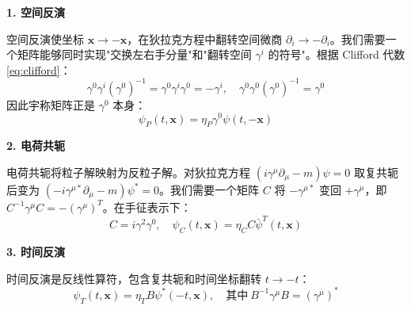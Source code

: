 \textbf{1. 空间反演 }

空间反演使坐标 $\boldsymbol{x} \to -\boldsymbol{x}$，在狄拉克方程中翻转空间微商 $\partial_i \to -\partial_i$。我们需要一个矩阵能够同时实现"交换左右手分量"和"翻转空间 $\gamma^i$ 的符号"。根据 Clifford 代数 \eqref{eq:clifford}：
\begin{equation}
    \gamma^0 \gamma^i (\gamma^0)^{-1} = \gamma^0 \gamma^i \gamma^0 = -\gamma^i, \quad \gamma^0 \gamma^0 (\gamma^0)^{-1} = \gamma^0
\end{equation}
因此宇称矩阵正是 $\gamma^0$ 本身：
\begin{equation}
    \psi_P(t, \boldsymbol{x}) = \eta_P \gamma^0 \psi(t, -\boldsymbol{x})
\end{equation}

\textbf{2. 电荷共轭 }

电荷共轭将粒子解映射为反粒子解。对狄拉克方程 $(i\gamma^\mu\partial_\mu - m)\psi = 0$ 取复共轭后变为 $(-i\gamma^{\mu *}\partial_\mu - m)\psi^* = 0$。我们需要一个矩阵 $C$ 将 $-\gamma^{\mu *}$ 变回 $+\gamma^\mu$，即 $C^{-1}\gamma^\mu C = -(\gamma^\mu)^T$。在手征表示下：
\begin{equation}
    C = i\gamma^2\gamma^0, \quad \psi_C(t, \boldsymbol{x}) = \eta_C C \bar{\psi}^T(t, \boldsymbol{x})
\end{equation}

\textbf{3. 时间反演}

时间反演是反线性算符，包含复共轭和时间坐标翻转 $t \to -t$：
\begin{equation}
    \psi_T(t, \boldsymbol{x}) = \eta_T B \psi^*(-t, \boldsymbol{x}), \quad \text{其中} \ B^{-1}\gamma^\mu B = (\gamma^\mu)^*
\end{equation}
